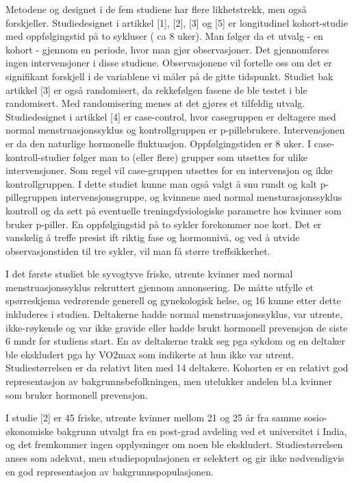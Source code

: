 \documentclass[
  letterpaper,
  DIV=11,
  numbers=noendperiod]{scrreprt}
\begin{document}
Metodene og designet i de fem studiene har flere likhetstrekk, men også
forskjeller. Studiedesignet i artikkel {[}1{]}, {[}2{]}, {[}3{]} og
{[}5{]} er longitudinel kohort-studie med oppfølgingstid på to sykluser
( ca 8 uker). Man følger da et utvalg - en kohort - gjennom en periode,
hvor man gjør observasjoner. Det gjennomføres ingen intervensjoner i
disse studiene. Observasjonene vil fortelle oss om det er signifikant
forskjell i de variablene vi måler på de gitte tidspunkt. Studiet bak
artikkel {[}3{]} er også randomisert, da rekkefølgen fasene de ble
testet i ble randomisert. Med randomisering menes at det gjøres et
tilfeldig utvalg. Studiedesignet i artikkel {[}4{]} er case-control,
hvor casegruppen er deltagere med normal menstruasjonssyklus og
kontrollgruppen er p-pillebrukere. Intervensjonen er da den naturlige
hormonelle fluktuasjon. Oppfølgingstiden er 8 uker. I
case-kontroll-studier følger man to (eller flere) grupper som utsettes
for ulike intervensjoner. Som regel vil case-gruppen utsettes for en
intervensjon og ikke kontrollgruppen. I dette studiet kunne man også
valgt å snu rundt og kalt p-pillegruppen intervensjonsgruppe, og
kvinnene med normal mensturasjonssyklus kontroll og da sett på
eventuelle treningsfysiologiske parametre hos kvinner som bruker
p-piller. En oppfølgingstid på to sykler forekommer noe kort. Det er
vanskelig å treffe presist ift riktig fase og hormonnivå, og ved å
utvide observasjonstiden til tre sykler, vil man få større
treffsikkerhet.

I det første studiet ble syvogtyve friske, utrente kvinner med normal
menstruasjonssyklus rekruttert gjennom annonsering. De måtte utfylle et
spørreskjema vedrørende generell og gynekologisk helse, og 16 kunne
etter dette inkluderes i studien. Deltakerne hadde normal
menstruasjonssyklus, var utrente, ikke-røykende og var ikke gravide
eller hadde brukt hormonell prevensjon de siste 6 mndr før studiens
start. En av deltakerne trakk seg pga sykdom og en deltaker ble
ekskludert pga hy VO2max som indikerte at hun ikke var utrent.
Studiestørrelsen er da relativt liten med 14 deltakere. Kohorten er en
relativt god representasjon av bakgrunnsbefolkningen, men utelukker
andelen bl.a kvinner som bruker hormonell prevensjon.

I studie {[}2{]} er 45 friske, utrente kvinner mellom 21 og 25 år fra
samme sosio-økonomiske bakgrunn utvalgt fra en post-grad avdeling ved et
universitet i India, og det fremkommer ingen opplysninger om noen ble
ekskludert. Studiestørrelsen anses som adekvat, men studiepopulasjonen
er selektert og gir ikke nødvendigvis en god representasjon av
bakgrunnspopulasjonen.
\end{document}
